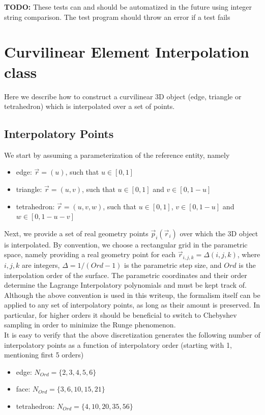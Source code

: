 \documentclass[12pt]{article}
\begin{document}
\textbf{TODO:} These tests can and should be automatized in the future using integer string comparison. The test program should throw an error if a test fails



\section{Curvilinear Element Interpolation class}

\noindent
Here we describe how to construct a curvilinear 3D object (edge, triangle or tetrahedron) which is interpolated over a set of points. \\

\subsection{Interpolatory Points}

\noindent
We start by assuming a parameterization of the reference entity, namely
\begin{itemize}
	\item edge:			$\vec{r}=(u)$,		such that $u \in [0,1]$
	\item triangle: 	$\vec{r}=(u,v)$,	such that $u \in [0,1]$ and $v \in [0, 1-u]$
	\item tetrahedron:	$\vec{r}=(u,v,w)$,	such that $u \in [0,1]$, $v \in [0, 1-u]$ and $w \in [0, 1-u-v]$ 
\end{itemize}

\noindent
Next, we provide a set of real geometry points $\vec{p}_i(\vec{r}_i)$ over which the 3D object is interpolated. By convention, we choose a rectangular grid in the parametric space, namely providing a real geometry point for each $\vec{r}_{i,j,k} = \Delta (i,j,k)$, where $i,j,k$ are integers, $\Delta = 1 / (Ord - 1)$ is the parametric step size, and $Ord$ is the interpolation order of the surface. The parametric coordinates and their order determine the Lagrange Interpolatory polynomials and must be kept track of. Although the above convention is used in this writeup, the formalism itself can be applied to any set of interpolatory points, as long as their amount is preserved. In particular, for higher orders it should be beneficial to switch to Chebyshev sampling in order to minimize the Runge phenomenon. \\

\noindent
It is easy to verify that the above discretization generates the following number of interpolatory points as a function of interpolatory order (starting with 1, mentioning first 5 orders)
\begin{itemize}
	\item edge:			$N_{Ord} = \{ 2,3,4,5,6 \}  $
	\item face:			$N_{Ord} = \{ 3,6,10,15,21 \}  $
	\item tetrahedron:	$N_{Ord} = \{ 4,10,20,35,56 \}  $
\end{itemize}
\end{document}
